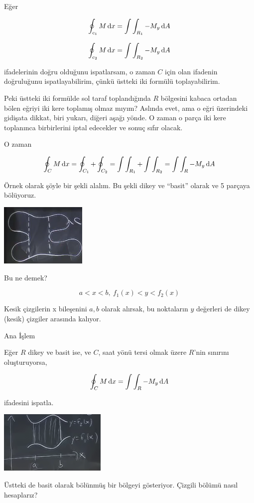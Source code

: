 \documentclass[12pt,fleqn]{article}\usepackage{../../common}
\begin{document}
Eğer 

$$ \oint_{c_1} M \,\mathrm{d} x  = \int \int_{R_1} -M_y \,\mathrm{d} A $$

$$ \oint_{c_2} M \,\mathrm{d} x  = \int \int_{R_2} -M_y \,\mathrm{d} A $$

ifadelerinin doğru olduğunu ispatlarsam, o zaman $C$ için olan ifadenin
doğruluğunu ispatlayabilirim, çünkü üstteki iki formülü toplayabilirim. 

Peki üstteki iki formülde sol taraf toplandığında $R$ bölgesini kabaca
ortadan bölen eğriyi iki kere toplamış olmaz mıyım? Aslında evet, ama o
eğri üzerindeki gidişata dikkat, biri yukarı, diğeri aşağı yönde. O zaman o
parça iki kere toplanınca birbirlerini iptal edecekler ve sonuç sıfır olacak.

O zaman 

$$
\oint_C M \,\mathrm{d} x = \oint_{C_1} + \oint_{C_2} =
\int \int_{R_1} + \int \int_{R_2} = \int \int_R -M_y \,\mathrm{d} A
$$

Örnek olarak şöyle bir şekli alalım. Bu şekli dikey ve ``basit'' olarak ve
5 parçaya bölüyoruz.

\includegraphics[height=3cm]{22_6.png}

Bu ne demek? 

$$ a < x < b, \ f_1(x) < y < f_2(x) $$

Kesik çizgilerin x bileşenini $a,b$ olarak alırsak, bu noktaların $y$
değerleri de dikey (kesik) çizgiler arasında kalıyor. 

Ana İşlem

Eğer $R$ dikey ve basit ise, ve $C$, saat yönü tersi olmak üzere $R$'nin
sınırını oluşturuyorsa, 

$$ \oint_C M \,\mathrm{d} x  = \int \int_R -M_y \,\mathrm{d} A $$

ifadesini ispatla. 

\includegraphics[height=3cm]{22_7.png}

Üstteki de basit olarak bölünmüş bir bölgeyi gösteriyor. Çizgili bölümü
nasıl hesaplarız?
\end{document}
